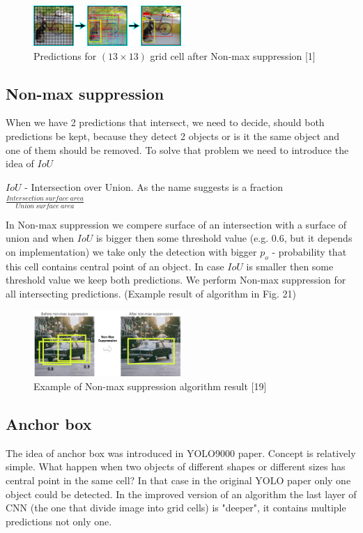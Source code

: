 \documentclass[letterpaper, 10 pt, conference]{ieeeconf}  %
\begin{document}
\begin{figure}[!ht]
	\centering
    \includegraphics[width=0.5\textwidth]{Pictures/YOLO_grid_cell.png}
	\caption{Predictions for $(13 \times 13)$ grid cell after Non-max suppression [1]}
\end{figure}

\subsection{Non-max suppression}
When we have 2 predictions that intersect, we need to decide, should both predictions be kept, because they detect 2 objects or is it the same object and one of them should be removed. To solve that problem we need to introduce the idea of $IoU$

$IoU$ - Intersection over Union. As the name suggests is a fraction $\frac{Intersection \: surface \: area}{Union \: surface \: area}$

In Non-max suppression we compere surface of an intersection with a surface of union and when $IoU$ is bigger then some threshold value (e.g. 0.6, but it depends on implementation) we take only the detection with bigger $p_o$ - probability that this cell contains central point of an object. In case $IoU$ is smaller then some threshold value we keep both predictions. We perform Non-max suppression for all intersecting predictions. (Example result of algorithm in Fig. 21) 

\begin{figure}[!ht]
	\centering
    \includegraphics[width=0.5\textwidth]{Pictures/Non_max_supression.png}
	\caption{Example of Non-max suppression algorithm result [19]}
\end{figure}


\subsection{Anchor box}
The idea of anchor box was introduced in YOLO9000 paper. Concept is relatively simple. What happen when two objects of different shapes or different sizes has central point in the same cell? In that case in the original YOLO paper only one object could be detected. In the improved version of an algorithm the last layer of CNN (the one that divide image into grid cells) is "deeper", it contains multiple predictions not only one. 
\end{document}
